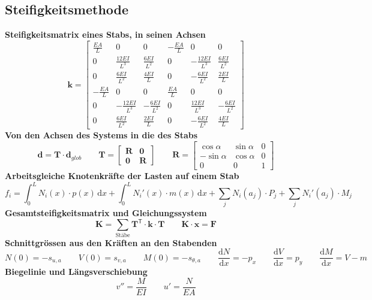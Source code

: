 \documentclass[11pt,a4paper]{article}
\begin{document}
\subsection{Steifigkeitsmethode}
\noindent\textbf{Steifigkeitsmatrix eines Stabs, in seinen Achsen}
\begin{equation*}
\mathbf{k} = \begin{bmatrix} \frac{EA}{L} & 0 & 0 & -\frac{EA}{L} & 0 & 0 \\ 0 & \frac{12EI}{L^3} & \frac{6EI}{L^2} & 0 & -\frac{12EI}{L^3} & \frac{6EI}{L^2} \\ 0 & \frac{6EI}{L^2} & \frac{4EI}{L} & 0 & -\frac{6EI}{L^2} & \frac{2EI}{L} \\ -\frac{EA}{L} & 0 & 0 & \frac{EA}{L} & 0 & 0 \\ 0 & -\frac{12EI}{L^3} & -\frac{6EI}{L^2} & 0 & \frac{12EI}{L^3} & -\frac{6EI}{L^2} \\ 0 & \frac{6EI}{L^2} & \frac{2EI}{L} & 0 & -\frac{6EI}{L^2} & \frac{4EI}{L} \end{bmatrix}
\end{equation*}
\noindent\textbf{Von den Achsen des Systems in die des Stabs}
\begin{equation*}
\mathbf{d} = \mathbf{T} \cdot \mathbf{d}_{glob} \qquad \mathbf{T} = \begin{bmatrix} \mathbf{R} & \mathbf{0} \\ \mathbf{0} & \mathbf{R} \end{bmatrix} \qquad \mathbf{R} = \begin{bmatrix} \cos\alpha & \sin\alpha & 0 \\ -\sin\alpha & \cos\alpha & 0 \\ 0 & 0 & 1 \end{bmatrix}
\end{equation*}
\noindent\textbf{Arbeitsgleiche Knotenkräfte der Lasten auf einem Stab}
\begin{equation*}
f_i = \int_0^L N_i(x) \cdot p(x)\,\mathrm{d}x + \int_0^L N_i'(x) \cdot m(x)\,\mathrm{d}x + \sum_j N_i(a_j) \cdot P_j + \sum_j N_i'(a_j) \cdot M_j
\end{equation*}
\noindent\textbf{Gesamtsteifigkeitsmatrix und Gleichungssystem}
\begin{equation*}
\mathbf{K} = \sum_{\text{Stäbe}} \mathbf{T}^{\mathsf{T}} \cdot \mathbf{k} \cdot \mathbf{T} \qquad \mathbf{K} \cdot \mathbf{x} = \mathbf{F}
\end{equation*}
\noindent\textbf{Schnittgrössen aus den Kräften an den Stabenden}
\begin{equation*}
N(0) = -s_{u,a} \qquad V(0) = s_{v,a} \qquad M(0) = -s_{\theta,a} \qquad \frac{\mathrm{d}N}{\mathrm{d}x} = -p_x \qquad \frac{\mathrm{d}V}{\mathrm{d}x} = p_y \qquad \frac{\mathrm{d}M}{\mathrm{d}x} = V - m
\end{equation*}
\noindent\textbf{Biegelinie und Längsverschiebung}
\begin{equation*}
v'' = \frac{M}{EI} \qquad u' = \frac{N}{EA}
\end{equation*}
\end{document}
